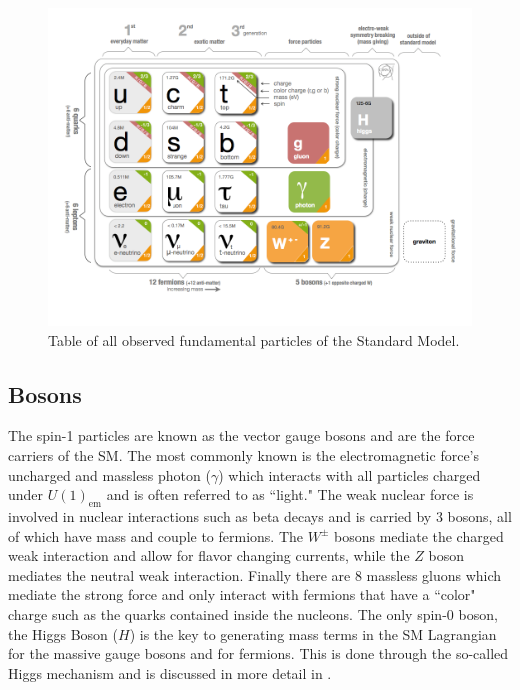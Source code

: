 \begin{figure}[!htbp]
  \begin{center}
    \includegraphics[width=\linewidth]{figures/theory/standard_model.png}
    \caption{ Table of all observed fundamental particles of the Standard
Model. \cite{Purcell:1473657}}
    \label{fig:standard_model}
  \end{center}
\end{figure}

\subsection{Bosons} \label{sec:theory:bosons}

The spin-1 particles are known as the vector gauge bosons and are the force
carriers of the SM.  The most commonly known is the electromagnetic force's
uncharged and massless photon ($\gamma$) which interacts with all particles
charged under $U(1)_{\text{em}}$ and is often referred to as ``light."  The
weak nuclear force is involved in nuclear interactions such as beta decays and
is carried by 3 bosons, all of which have mass and couple to fermions.  The
$W^{\pm}$ bosons mediate the charged weak interaction and allow for flavor
changing currents, while the $Z$ boson mediates the neutral weak interaction.
Finally there are 8 massless gluons which mediate the strong force and only
interact with fermions that have a ``color" charge such as the quarks contained
inside the nucleons. The only spin-0 boson, the Higgs Boson ($H$) is the key to
generating mass terms in the SM Lagrangian for the massive gauge bosons and for
fermions.  This is done through the so-called Higgs mechanism
\cite{Thomson:2013zua} and is discussed in more detail in
.

